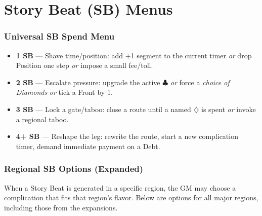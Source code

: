 \documentclass[11pt,letterpaper,twoside]{book}
\newcommand{\SuitClub}{\ensuremath{\clubsuit}}
\newcommand{\SuitDiamond}{\ensuremath{\diamondsuit}}
\begin{document}
\chapter{Story Beat (SB) Menus}
\label{chap:sbmenus}

\subsection{Universal SB Spend Menu}
\begin{itemize}
\item \textbf{1 SB} --- Shave time/position: add +1 segment to the current timer \emph{or} drop Position one step \emph{or} impose a small fee/toll.
\item \textbf{2 SB} --- Escalate pressure: upgrade the active \SuitClub{} \emph{or} force a \emph{choice of Diamonds} \emph{or} tick a Front by 1.
\item \textbf{3 SB} --- Lock a gate/taboo: close a route until a named \SuitDiamond{} is spent \emph{or} invoke a regional taboo.
\item \textbf{4+ SB} --- Reshape the leg: rewrite the route, start a new complication timer, demand immediate payment on a Debt.
\end{itemize}

\subsection{Regional SB Options (Expanded)}
When a Story Beat is generated in a specific region, the GM may choose a complication that fits that region's flavor. Below are options for all major regions, including those from the expansions.
\end{document}
